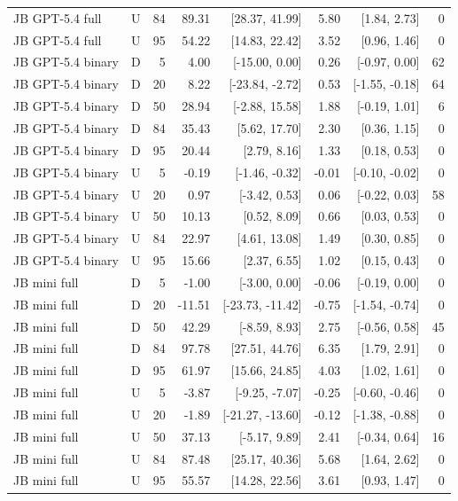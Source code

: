 \begin{table}[!ht]
\begin{tabular}{llrrrrrr}
JB GPT-5.4 full & U & 84 & 89.31 & [28.37, 41.99] & 5.80 & [1.84, 2.73] & 0 \\
JB GPT-5.4 full & U & 95 & 54.22 & [14.83, 22.42] & 3.52 & [0.96, 1.46] & 0 \\
JB GPT-5.4 binary & D & 5 & 4.00 & [-15.00, 0.00] & 0.26 & [-0.97, 0.00] & 62 \\
JB GPT-5.4 binary & D & 20 & 8.22 & [-23.84, -2.72] & 0.53 & [-1.55, -0.18] & 64 \\
JB GPT-5.4 binary & D & 50 & 28.94 & [-2.88, 15.58] & 1.88 & [-0.19, 1.01] & 6 \\
JB GPT-5.4 binary & D & 84 & 35.43 & [5.62, 17.70] & 2.30 & [0.36, 1.15] & 0 \\
JB GPT-5.4 binary & D & 95 & 20.44 & [2.79, 8.16] & 1.33 & [0.18, 0.53] & 0 \\
JB GPT-5.4 binary & U & 5 & -0.19 & [-1.46, -0.32] & -0.01 & [-0.10, -0.02] & 0 \\
JB GPT-5.4 binary & U & 20 & 0.97 & [-3.42, 0.53] & 0.06 & [-0.22, 0.03] & 58 \\
JB GPT-5.4 binary & U & 50 & 10.13 & [0.52, 8.09] & 0.66 & [0.03, 0.53] & 0 \\
JB GPT-5.4 binary & U & 84 & 22.97 & [4.61, 13.08] & 1.49 & [0.30, 0.85] & 0 \\
JB GPT-5.4 binary & U & 95 & 15.66 & [2.37, 6.55] & 1.02 & [0.15, 0.43] & 0 \\
JB mini full & D & 5 & -1.00 & [-3.00, 0.00] & -0.06 & [-0.19, 0.00] & 0 \\
JB mini full & D & 20 & -11.51 & [-23.73, -11.42] & -0.75 & [-1.54, -0.74] & 0 \\
JB mini full & D & 50 & 42.29 & [-8.59, 8.93] & 2.75 & [-0.56, 0.58] & 45 \\
JB mini full & D & 84 & 97.78 & [27.51, 44.76] & 6.35 & [1.79, 2.91] & 0 \\
JB mini full & D & 95 & 61.97 & [15.66, 24.85] & 4.03 & [1.02, 1.61] & 0 \\
JB mini full & U & 5 & -3.87 & [-9.25, -7.07] & -0.25 & [-0.60, -0.46] & 0 \\
JB mini full & U & 20 & -1.89 & [-21.27, -13.60] & -0.12 & [-1.38, -0.88] & 0 \\
JB mini full & U & 50 & 37.13 & [-5.17, 9.89] & 2.41 & [-0.34, 0.64] & 16 \\
JB mini full & U & 84 & 87.48 & [25.17, 40.36] & 5.68 & [1.64, 2.62] & 0 \\
JB mini full & U & 95 & 55.57 & [14.28, 22.56] & 3.61 & [0.93, 1.47] & 0 \\

\end{tabular}
\end{table}
